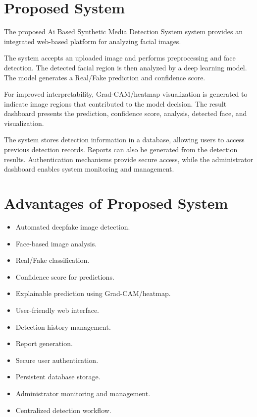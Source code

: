 \documentclass[12pt,a4paper,oneside]{report}
\begin{document}
\section{Proposed System}

The proposed Ai Based Synthetic Media Detection System system provides an integrated web-based platform for analyzing facial images.

The system accepts an uploaded image and performs preprocessing and face detection. The detected facial region is then analyzed by a deep learning model. The model generates a Real/Fake prediction and confidence score.

For improved interpretability, Grad-CAM/heatmap visualization is generated to indicate image regions that contributed to the model decision. The result dashboard presents the prediction, confidence score, analysis, detected face, and visualization.

The system stores detection information in a database, allowing users to access previous detection records. Reports can also be generated from the detection results. Authentication mechanisms provide secure access, while the administrator dashboard enables system monitoring and management.

\section{Advantages of Proposed System}

\begin{itemize}
    \item Automated deepfake image detection.
    \item Face-based image analysis.
    \item Real/Fake classification.
    \item Confidence score for predictions.
    \item Explainable prediction using Grad-CAM/heatmap.
    \item User-friendly web interface.
    \item Detection history management.
    \item Report generation.
    \item Secure user authentication.
    \item Persistent database storage.
    \item Administrator monitoring and management.
    \item Centralized detection workflow.
\end{itemize}
\end{document}
